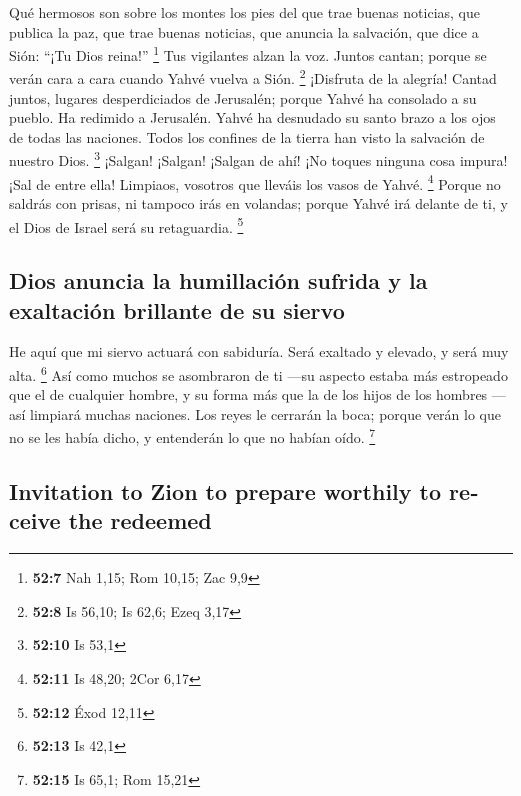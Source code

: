\begin{paracol}{2}
 Qué hermosos son sobre los montes los pies del que trae
buenas noticias, que publica la paz, que trae buenas noticias, que
anuncia la salvación, que dice a Sión: ``¡Tu Dios reina!'' \footnote{\textbf{52:7}
  Nah 1,15; Rom 10,15; Zac 9,9}  Tus vigilantes alzan la
voz. Juntos cantan; porque se verán cara a cara cuando Yahvé vuelva a
Sión. \footnote{\textbf{52:8} Is 56,10; Is 62,6; Ezeq 3,17}
 ¡Disfruta de la alegría! Cantad juntos, lugares
desperdiciados de Jerusalén; porque Yahvé ha consolado a su pueblo. Ha
redimido a Jerusalén.  Yahvé ha desnudado su santo brazo
a los ojos de todas las naciones. Todos los confines de la tierra han
visto la salvación de nuestro Dios. \footnote{\textbf{52:10} Is 53,1}
 ¡Salgan! ¡Salgan! ¡Salgan de ahí! ¡No toques ninguna
cosa impura! ¡Sal de entre ella! Limpiaos, vosotros que lleváis los
vasos de Yahvé. \footnote{\textbf{52:11} Is 48,20; 2Cor 6,17}
 Porque no saldrás con prisas, ni tampoco irás en
volandas; porque Yahvé irá delante de ti, y el Dios de Israel será su
retaguardia. \footnote{\textbf{52:12} Éxod 12,11}

\hypertarget{dios-anuncia-la-humillaciuxf3n-sufrida-y-la-exaltaciuxf3n-brillante-de-su-siervo}{%
\subsection{Dios anuncia la humillación sufrida y la exaltación
brillante de su
siervo}\label{dios-anuncia-la-humillaciuxf3n-sufrida-y-la-exaltaciuxf3n-brillante-de-su-siervo}}

 He aquí que mi siervo actuará con sabiduría. Será
exaltado y elevado, y será muy alta. \footnote{\textbf{52:13} Is 42,1}
 Así como muchos se asombraron de ti ---su aspecto estaba
más estropeado que el de cualquier hombre, y su forma más que la de los
hijos de los hombres ---  así limpiará muchas naciones.
Los reyes le cerrarán la boca; porque verán lo que no se les había
dicho, y entenderán lo que no habían oído. \footnote{\textbf{52:15} Is
  65,1; Rom 15,21}

\switchcolumn
\begin{otherlanguage}{english}

\hypertarget{invitation-to-zion-to-prepare-worthily-to-receive-the-redeemed}{%
\subsection{Invitation to Zion to prepare worthily to receive the
redeemed}\label{invitation-to-zion-to-prepare-worthily-to-receive-the-redeemed}}


\end{otherlanguage}
\end{paracol}
